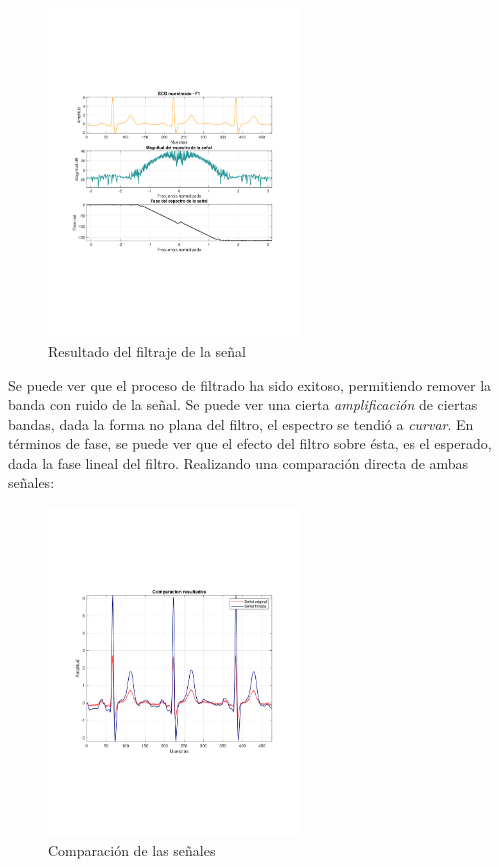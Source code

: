 		\begin{figure}[H]
			\center
			\includegraphics[width=0.6\textwidth,clip, trim = {1.9cm 6.8cm 2.3cm 7cm}]{../plots/ecg_poles_0_filtered.pdf}
			\caption{Resultado del filtraje de la señal}
			\label{fig:ecg_filtered_0}
		\end{figure}
		
		Se puede ver que el proceso de filtrado ha sido exitoso, permitiendo remover la banda con ruido de la señal. Se puede ver una cierta \textit{amplificación} de ciertas bandas, dada la forma no plana del filtro, el espectro se tendió a \textit{curvar}. En términos de fase, se puede ver que el efecto del filtro sobre ésta, es el esperado, dada la fase lineal del filtro. Realizando una comparación directa de ambas señales:
		\begin{figure}[H]
			\center
			\includegraphics[width=0.6\textwidth,clip, trim = {1.9cm 6.8cm 2.3cm 7cm}]{../plots/egc_f_0_comparative.pdf}
			\caption{Comparación de las señales}
			\label{fig:ecg_filtered_0_comparative}
		\end{figure}
		
